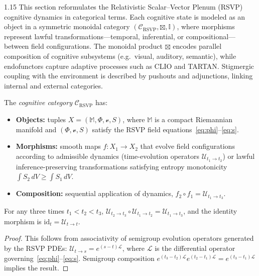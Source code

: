 \documentclass[12pt,a4paper]{article}
\begin{document}
\begin{spacing}{1.15}
This section reformulates the Relativistic Scalar–Vector Plenum (RSVP) cognitive dynamics in categorical terms.
Each cognitive state is modeled as an object in a symmetric monoidal category
\((\mathcal{C}_{\mathrm{RSVP}}, \boxtimes, \mathbb{I})\),
where morphisms represent lawful transformations—temporal, inferential, or compositional—between field configurations.
The monoidal product \(\boxtimes\) encodes parallel composition of cognitive subsystems
(e.g.\ visual, auditory, semantic),
while endofunctors capture adaptive processes such as CLIO and TARTAN.
Stigmergic coupling with the environment is described by pushouts and adjunctions,
linking internal and external categories.

\begin{definition}
\label{def:cognitive-cat}
The \emph{cognitive category} \(\mathcal{C}_{\mathrm{RSVP}}\) has:
\begin{itemize}[nosep]
  \item \textbf{Objects:} tuples \(X=(\mathbb{M}, \Phi, \boldsymbol{\mathcal{v}}, S)\),
        where \(\mathbb{M}\) is a compact Riemannian manifold and
        \((\Phi, \boldsymbol{\mathcal{v}}, S)\) satisfy the RSVP field equations~\eqref{eq:phi}--\eqref{eq:s}.
  \item \textbf{Morphisms:} smooth maps
        \(f: X_1 \to X_2\)
        that evolve field configurations according to admissible dynamics
        (time-evolution operators \(\mathcal{U}_{t_1 \to t_2}\))
        or lawful inference-preserving transformations satisfying entropy monotonicity
        \(\int S_{2}\,dV \ge \int S_{1}\,dV\).
  \item \textbf{Composition:} sequential application of dynamics,
        \(f_2 \circ f_1 = \mathcal{U}_{t_1 \to t_3}\).
\end{itemize}
\end{definition}

\begin{proposition}
\label{prop:temporal}
For any three times \(t_1<t_2<t_3\),
\(\mathcal{U}_{t_2 \to t_3} \circ \mathcal{U}_{t_1 \to t_2} = \mathcal{U}_{t_1 \to t_3}\),
and the identity morphism is \(\mathrm{id}_{t} = \mathcal{U}_{t\to t}\).
\end{proposition}

\begin{proof}
This follows from associativity of semigroup evolution operators generated by the RSVP PDEs:
\(\mathcal{U}_{t\to s} = e^{(s-t)\mathcal{L}}\),
where \(\mathcal{L}\) is the differential operator governing~\eqref{eq:phi}--\eqref{eq:s}.
Semigroup composition \(e^{(t_3-t_2)\mathcal{L}} e^{(t_2-t_1)\mathcal{L}} = e^{(t_3-t_1)\mathcal{L}}\)
implies the result.
\end{proof}


\end{spacing}
\end{document}
